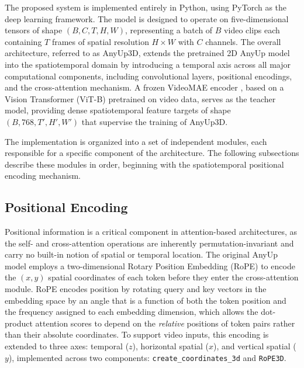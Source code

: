 The proposed system is implemented entirely in Python, using PyTorch as the deep learning framework. The model is designed to operate on five-dimensional tensors of shape $(B, C, T, H, W)$, representing a batch of $B$ video clips each containing $T$ frames of spatial resolution $H \times W$ with $C$ channels. The overall architecture, referred to as AnyUp3D, extends the pretrained 2D AnyUp model \cite{anyup} into the spatiotemporal domain by introducing a temporal axis across all major computational components, including convolutional layers, positional encodings, and the cross-attention mechanism. A frozen VideoMAE encoder \cite{videomae}, based on a Vision Transformer (ViT-B) pretrained on video data, serves as the teacher model, providing dense spatiotemporal feature targets of shape $(B, 768, T', H', W')$ that supervise the training of AnyUp3D.

The implementation is organized into a set of independent modules, each responsible for a specific component of the architecture. The following subsections describe these modules in order, beginning with the spatiotemporal positional encoding mechanism.

\subsection{Positional Encoding}
\label{sec:rope3d}

Positional information is a critical component in attention-based architectures, as the self- and cross-attention operations are inherently permutation-invariant and carry no built-in notion of spatial or temporal location. The original AnyUp~\cite{anyup} model employs a two-dimensional Rotary Position Embedding (RoPE) \cite{su2024rope} to encode the $(x, y)$ spatial coordinates of each token before they enter the cross-attention module. RoPE encodes position by rotating query and key vectors in the embedding space by an angle that is a function of both the token position and the frequency assigned to each embedding dimension, which allows the dot-product attention scores to depend on the \emph{relative} positions of token pairs rather than their absolute coordinates. To support video inputs, this encoding is extended to three axes: temporal ($z$), horizontal spatial ($x$), and vertical spatial ($y$), implemented across two components: \texttt{create\_coordinates\_3d} and \texttt{RoPE3D}.

